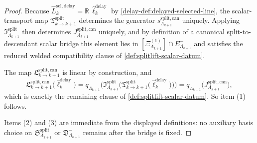 \documentclass[11pt]{article}
\theoremstyle{definition}
\theoremstyle{plain}
\theoremstyle{remark}
\newcommand{\1}{\mathbf 1}
\begin{document}
\begin{proof}
Because
\(
\widehat L^{\mathrm{sel,delay}}_k
=
\mathbb R\,\widehat\ell^{\mathrm{delay}}_k
\)
by \cref{delay-def:delayed-selected-line}, the scalar-transport map
\(
\mathfrak T^{\mathrm{split}}_{k\to k+1}
\)
determines the generator
\(
s^{\mathrm{split,can}}_{\Lambda_{k+1}}
\)
uniquely.
Applying
\(
\mathfrak I^{\mathrm{split}}_{\Lambda_{k+1}}
\)
then determines
\(
J^{\mathrm{split,can}}_{\Lambda_{k+1}}
\)
uniquely, and by definition of a canonical split-to-descendant scalar bridge this element lies in
\(
[\Xi^{(1)}_{\Lambda_{k+1}}]\cap E^-_{\Lambda_{k+1}}
\)
and satisfies the reduced welded compatibility clause of
\cref{def:splitlift-scalar-datum}.

The map
\(
\mathfrak L^{\mathrm{split,can}}_{k\to k+1}
\)
is linear by construction, and
\[
\mathfrak L^{\mathrm{split,can}}_{k\to k+1}
\bigl(\widehat\ell^{\mathrm{delay}}_k\bigr)
=
q_{\Lambda_{k+1}}
\!\bigl(
\mathfrak I^{\mathrm{split}}_{\Lambda_{k+1}}
\bigl(
\mathfrak T^{\mathrm{split}}_{k\to k+1}
\bigl(\widehat\ell^{\mathrm{delay}}_k\bigr)
\bigr)
\bigr)
=
q_{\Lambda_{k+1}}
\!\bigl(
J^{\mathrm{split,can}}_{\Lambda_{k+1}}
\bigr),
\]
which is exactly the remaining clause of \cref{def:splitlift-scalar-datum}.
So item \textnormal{(1)} follows.

Items \textnormal{(2)} and \textnormal{(3)} are immediate from the displayed definitions: no
auxiliary basis choice on
\(
\mathfrak S^{\mathrm{split}}_{\Lambda_{k+1}}
\)
or
\(
\mathfrak D^-_{\Lambda_{k+1}}
\)
remains after the bridge is fixed.
\end{proof}
\end{document}
